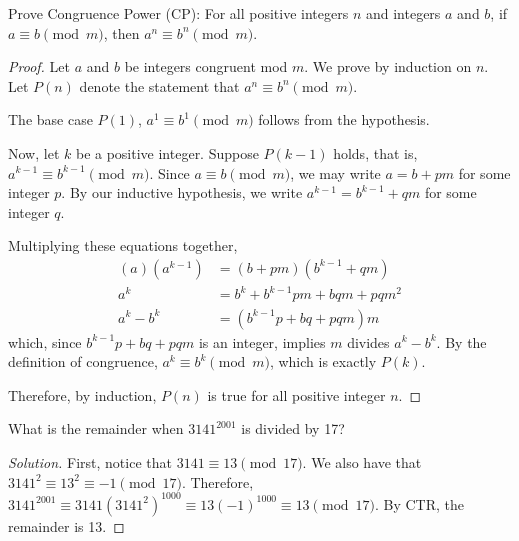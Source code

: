 \question Prove Congruence Power (CP): For all positive integers $n$ and integers $a$ and $b$,
if $a \equiv b \pmod m$, then $a^n \equiv b^n \pmod m$.
\begin{proof}
  Let $a$ and $b$ be integers congruent mod $m$.
  We prove by induction on $n$.
  Let $P(n)$ denote the statement that $a^n \equiv b^n \pmod{m}$.

  The base case $P(1)$, $a^1 \equiv b^1 \pmod{m}$ follows from the hypothesis.

  Now, let $k$ be a positive integer.
  Suppose $P(k-1)$ holds, that is, $a^{k-1} \equiv b^{k-1} \pmod{m}$.
  Since $a \equiv b \pmod{m}$, we may write $a = b + pm$ for some integer $p$.
  By our inductive hypothesis, we write $a^{k-1} = b^{k-1} + qm$ for some integer $q$.

  Multiplying these equations together, \begin{align*}
    (a)(a^{k-1}) & = (b + pm)(b^{k-1} + qm)        \\
    a^k          & = b^k + b^{k-1}pm + bqm + pqm^2 \\
    a^k - b^k    & = (b^{k-1}p + bq + pqm)m
  \end{align*}
  which, since $b^{k-1}p+bq+pqm$ is an integer, implies $m$ divides $a^k - b^k$.
  By the definition of congruence, $a^k \equiv b^k \pmod{m}$, which is exactly $P(k)$.

  Therefore, by induction, $P(n)$ is true for all positive integer $n$.
\end{proof}


\question What is the remainder when $3141^{2001}$ is divided by 17?
\begin{proof}[Solution]
  First, notice that $3141 \equiv 13 \pmod{17}$.
  We also have that $3141^2 \equiv 13^2 \equiv -1 \pmod{17}$.
  Therefore, $3141^{2001} \equiv 3141(3141^2)^{1000} \equiv 13(-1)^{1000} \equiv 13 \pmod{17}$.
  By CTR, the remainder is 13.
\end{proof}


